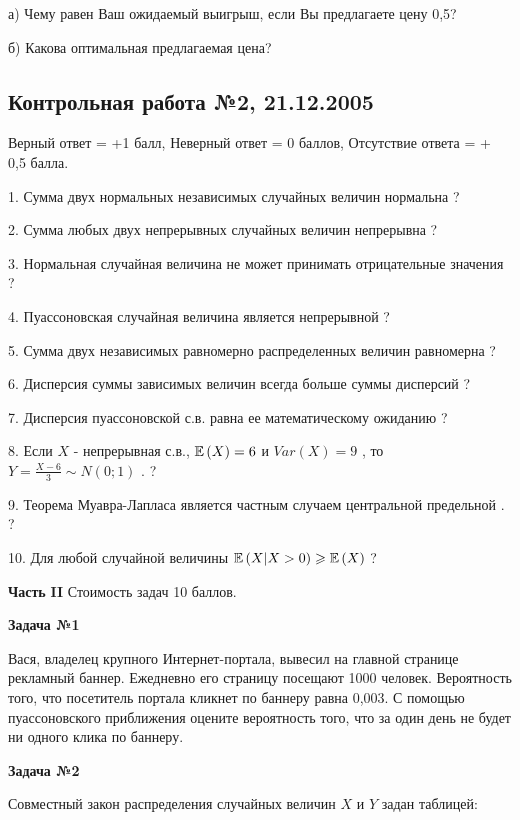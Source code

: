 \documentclass[12pt, a4paper]{article}\usepackage[]{graphicx}\usepackage[]{color}
\begin{document}
а)	Чему равен Ваш ожидаемый выигрыш, если Вы предлагаете цену 0,5?

б)	Какова оптимальная предлагаемая цена?


\subsection{Контрольная работа №2, 21.12.2005}




Верный ответ = +1 балл, Неверный ответ = 0 баллов, Отсутствие ответа = + 0,5 балла.

1. Сумма двух нормальных независимых случайных величин нормальна ?

2. Сумма любых двух непрерывных случайных величин непрерывна ?

3. Нормальная случайная величина не может принимать отрицательные значения ?

4. Пуассоновская случайная величина является непрерывной ?

5. Сумма двух независимых равномерно распределенных величин равномерна ?

6. Дисперсия суммы зависимых величин всегда больше суммы дисперсий ?

7. Дисперсия пуассоновской с.в. равна ее математическому ожиданию ?

8. Если  $X$  - непрерывная с.в.,  $\mathbb{E}\left(X\right)=6$  и  $Var\left(X\right)=9$ , то  $Y=\frac{X-6}{3} \sim N\left(0;1\right)$ . ?

9. Теорема Муавра-Лапласа является частным случаем центральной предельной . ?

10. Для любой случайной величины  $\mathbb{E}\left(X|X>0\right)\geqslant \mathbb{E}\left(X\right)$  ?

{\bf Часть }{\bf II} Стоимость задач 10 баллов.

{\bf Задача №1}

Вася, владелец крупного Интернет-портала, вывесил на главной странице рекламный баннер. Ежедневно его страницу посещают 1000 человек. Вероятность того, что посетитель портала кликнет по баннеру равна 0,003. С помощью пуассоновского приближения оцените вероятность того, что за один день не будет ни одного клика по баннеру.

{\bf Задача №2}

Совместный закон распределения случайных величин  $X$  и  $Y$  задан таблицей:
\end{document}
